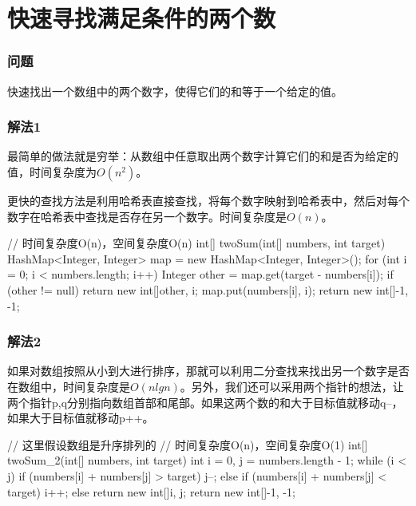 \section{快速寻找满足条件的两个数} %
\label{sec:two-sum}

\subsubsection{问题}
快速找出一个数组中的两个数字，使得它们的和等于一个给定的值。

\subsubsection{解法1}
最简单的做法就是穷举：从数组中任意取出两个数字计算它们的和是否为给定的值，时间复杂度为$O(n^2)$。

更快的查找方法是利用哈希表直接查找，将每个数字映射到哈希表中，然后对每个数字在哈希表中查找是否存在另一个数字。时间复杂度是$O(n)$。

\begin{Code}
// 时间复杂度O(n)，空间复杂度O(n)
int[] twoSum(int[] numbers, int target) {
    HashMap<Integer, Integer> map = new HashMap<Integer, Integer>();
    for (int i = 0; i < numbers.length; i++) {
        Integer other = map.get(target - numbers[i]);
        if (other != null) {
            return new int[]{other, i};
        }
        map.put(numbers[i], i);
    }
    return new int[]{-1, -1};
}
\end{Code}

\subsubsection{解法2}
如果对数组按照从小到大进行排序，那就可以利用二分查找来找出另一个数字是否在数组中，时间复杂度是$O(nlgn)$。另外，我们还可以采用两个指针的想法，让两个指针p,q分别指向数组首部和尾部。如果这两个数的和大于目标值就移动q--，
如果大于目标值就移动p++。

\begin{Code}
// 这里假设数组是升序排列的
// 时间复杂度O(n)，空间复杂度O(1)
int[] twoSum_2(int[] numbers, int target) {
    int i = 0, j = numbers.length - 1;
    while (i < j) {
        if (numbers[i] + numbers[j] > target) {
            j--;
        } else if (numbers[i] + numbers[j] < target) {
            i++;
        } else {
            return new int[]{i, j};
        }
    }
    return new int[]{-1, -1};
}
\end{Code}

